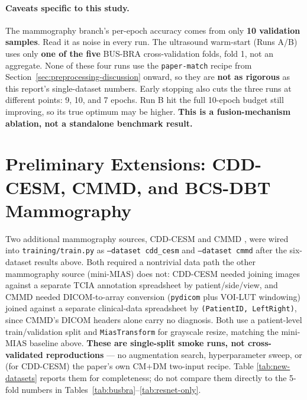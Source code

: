 \documentclass[11pt]{article}
\begin{document}
\paragraph{Caveats specific to this study.} The mammography branch's
per-epoch accuracy comes from only \textbf{10 validation samples}. Read it
as noise in every run. The ultrasound warm-start (Runs A/B) uses only
\textbf{one of the five} BUS-BRA cross-validation folds, fold 1, not an
aggregate. None of these four runs use the \texttt{paper-match} recipe from
Section~\ref{sec:preprocessing-discussion} onward, so they are \textbf{not
as rigorous} as this report's single-dataset numbers. Early stopping also
cuts the three runs at different points: 9, 10, and 7 epochs. Run B hit the
full 10-epoch budget still improving, so its true optimum may be higher.
\textbf{This is a fusion-mechanism ablation, not a standalone benchmark
result.}

\section{Preliminary Extensions: CDD-CESM, CMMD, and BCS-DBT Mammography}
\label{sec:new-datasets}

Two additional mammography sources, CDD-CESM \citep{khaled2022cddcesm} and
CMMD \citep{cui2021cmmd}, were wired into \texttt{training/train.py} as
\texttt{--dataset cdd\_cesm} and \texttt{--dataset cmmd} after the
six-dataset results above. Both required a nontrivial data path the other
mammography source (mini-MIAS) does not: CDD-CESM needed joining images
against a separate TCIA annotation spreadsheet by patient/side/view, and
CMMD needed DICOM-to-array conversion (\texttt{pydicom} plus VOI-LUT
windowing) joined against a separate clinical-data spreadsheet by
\texttt{(PatientID, LeftRight)}, since CMMD's DICOM headers alone carry no
diagnosis. Both use a patient-level train/validation split and
\texttt{MiasTransform} for grayscale resize, matching the mini-MIAS
baseline above. \textbf{These are single-split smoke runs, not
cross-validated reproductions} — no augmentation search, hyperparameter
sweep, or (for CDD-CESM) the paper's own CM+DM two-input recipe. Table
\ref{tab:new-datasets} reports them for completeness; do not compare them
directly to the 5-fold numbers in Tables~\ref{tab:busbra}--\ref{tab:resnet-only}.
\end{document}
